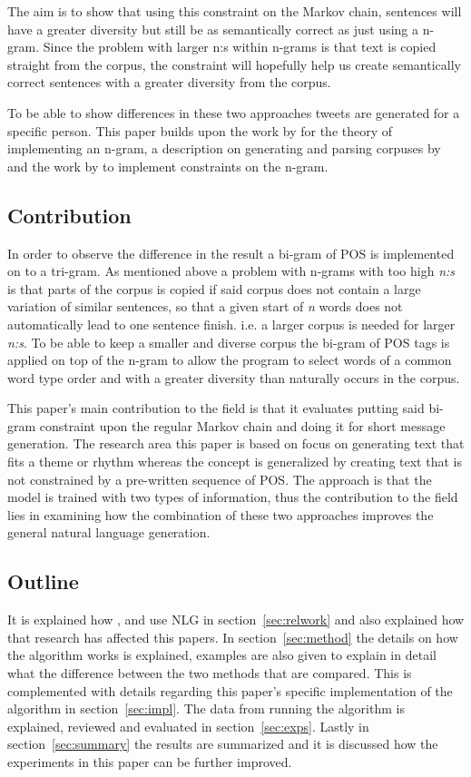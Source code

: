 \documentclass[a4paper,12pt]{article}
\begin{document}
The aim is to show that using this constraint on the Markov chain, sentences will have a greater diversity but still be as semantically correct as just using a n-gram.
Since the problem with larger n:s within n-grams is that text is copied straight from the corpus, 
the constraint will hopefully help us create semantically correct sentences with a greater diversity from the corpus.

To be able to show differences in these two approaches tweets are generated for a specific person.
This paper builds upon the work by \cite{shannon48} for the theory of implementing an n-gram, a description on generating and parsing corpuses by \citep{Corpus}
and the work by \citealp{McBarb} to implement constraints on the n-gram.
   
\subsection{Contribution}

In order to observe the difference in the result a bi-gram of POS is implemented on to a tri-gram. 
As mentioned above a problem with n-grams with too high \textit{n:s} is that parts of the corpus is copied if said corpus does not contain a large variation of similar sentences, 
so that a given start of \textit{n} words does not automatically lead to one sentence finish. i.e. a larger corpus is needed for larger \textit{n:s}.
To be able to keep a smaller and diverse corpus the bi-gram of POS tags is applied on top of the n-gram to allow the program to select words of a common word type order and with a greater diversity than naturally occurs in the corpus.

This paper's main contribution to the field is that it evaluates putting said bi-gram constraint upon the regular Markov chain and doing it for short message generation.
The research area this paper is based on focus on generating text that fits a theme or rhythm whereas the concept is generalized by creating text that is not constrained by a pre-written sequence of POS. 
The approach is that the model is trained with two types of information, thus the contribution to the field lies in examining how the combination of these two approaches improves the general natural language generation.

\subsection{Outline}
It is explained how \citep{shannon48}, \citep{Corpus} and \cite{McBarb} use NLG in section~\ref{sec:relwork} and also explained how that research has affected this papers. 
In section~\ref{sec:method} the details on how the algorithm works is explained, 
examples are also given to explain in detail what the difference between the two methods that are compared. 
This is complemented with details regarding this paper's specific implementation of the algorithm in section~\ref{sec:impl}. 
The data from running the algorithm is explained, reviewed and evaluated in section~\ref{sec:exps}. Lastly in section~\ref{sec:summary} the results are summarized and it is discussed how the experiments in this paper can be further improved.
\end{document}
